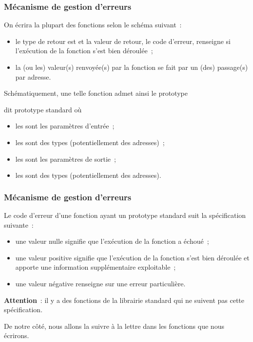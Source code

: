 \begin{frame} \frametitle{Mécanisme de gestion d'erreurs}
On écrira la plupart des fonctions selon le schéma suivant~:

\begin{itemize}
    \item le type de retour est  et la valeur de retour, le 
    \alert{code d'erreur}, renseigne si l'exécution de la fonction s'est 
    bien déroulée~;
    \smallskip
    
    \item la (ou les) valeur(s) \og renvoyée(s) \fg{} par la fonction 
    se fait par un (des) passage(s) par adresse.
\end{itemize}
\bigskip

Schématiquement, une telle fonction admet ainsi le prototype
\begin{center}
\end{center}
dit \alert{prototype standard} où

\begin{itemize}
    \item les  sont les paramètres d'entrée~;
    \smallskip
    
    \item les  sont des types (potentiellement des adresses)~;
    \smallskip
    
    \item les  sont les paramètres de sortie~;
    \smallskip
    
    \item les  sont des types (potentiellement des adresses).
\end{itemize}
\end{frame}

\begin{frame} \frametitle{Mécanisme de gestion d'erreurs}
Le \alert{code d'erreur} d'une fonction ayant un prototype standard 
suit la spécification suivante~:

\begin{itemize}
    \item une valeur nulle signifie que l'exécution de la fonction a 
    échoué~;
    \smallskip
    
    \item une valeur positive signifie que l'exécution de la fonction 
    s'est bien déroulée et apporte une information supplémentaire 
    exploitable~;
    \smallskip
    
    \item une valeur négative renseigne sur une erreur particulière.
\end{itemize}
\bigskip
\bigskip

{\bf Attention}~: il y a des fonctions de la librairie standard qui ne 
suivent pas cette spécification.
\smallskip

De notre côté, nous allons la suivre à la lettre dans les fonctions que 
nous écrirons.
\end{frame}


